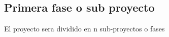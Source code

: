 \subsection{Primera fase o sub proyecto}







El proyecto sera dividido en n sub-proyectos o fases
